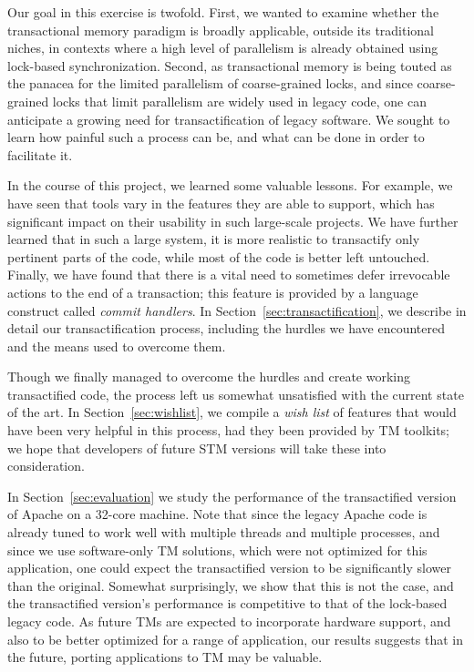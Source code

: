 \documentclass[11pt]{sigplanconf}
\begin{document}
Our goal in this exercise is twofold. First, we wanted to examine whether the transactional 
memory paradigm is broadly applicable, outside its traditional niches, in contexts where a 
high level of parallelism is already obtained using lock-based synchronization. 
%
Second, as transactional memory is being touted as the panacea for the limited parallelism 
of coarse-grained locks, and since coarse-grained locks that limit parallelism are widely used 
in legacy code, one can anticipate a growing need for transactification of legacy software. 
We sought to learn how painful such a process can be, and what can be done in order to 
facilitate it.

In the course of this project, we learned some valuable lessons.
For example, we have seen that tools vary in the features they are able
to support, which has significant impact on their usability in 
such large-scale projects. We have further learned that in such a large
system, it is more realistic to transactify only pertinent parts of the code,
while most of the code is better left untouched. Finally, we have found
that there is a vital need to sometimes defer irrevocable actions to
the end of a transaction; this feature is provided by a language construct called 
\emph{commit handlers}. In Section~\ref{sec:transactification}, 
we describe in detail our transactification
process, including the hurdles we have encountered and the means used to
overcome them.

Though we finally managed to overcome the hurdles and create working transactified 
code, the process left us somewhat unsatisfied with the current state of the art. 
In Section~\ref{sec:wishlist}, we compile a \emph{wish list} of features 
that would have been very helpful in this process, had they been provided
by TM toolkits; we hope that developers of future STM versions
will take these into consideration. 

In Section~\ref{sec:evaluation} we study the performance of the transactified 
version of Apache on a 32-core machine. 
Note that since the legacy Apache code is already 
tuned to work well with multiple threads and multiple processes, 
and since we use software-only TM solutions, which were not optimized for this 
application, one could expect the transactified version to be significantly
slower than the original.
Somewhat surprisingly, we show that this is not the case, and the 
transactified 
version's performance is competitive to that of the lock-based legacy code. 
As future TMs are expected to incorporate hardware support, and also 
to be better optimized for a range of application, our results 
suggests that in the future, porting applications to TM may be valuable.
\end{document}
